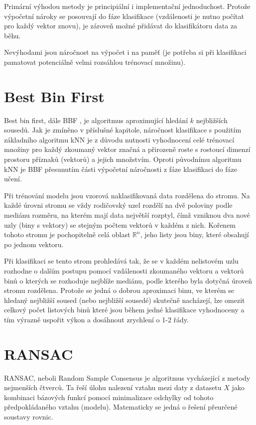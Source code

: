 	Primární výhodou metody je principiální i implementační jednoduchost. Protože výpočetní nároky se posouvají do fáze klasifikace (vzdálenosti je nutno počítat pro každý vektor znovu), je zároveň možné přidávat do klasifikátoru data za běhu.
	
	Nevýhodami jsou náročnost na výpočet i na paměť (je potřeba si při klasifikaci pamatovat potenciálně velmi rozsáhlou trénovací množinu).
	
\section{Best Bin First}
\label{sec:bbf}
	Best bin first, dále BBF \cite{beis1997shape}, je algoritmus aproximující hledání $k$ nejbližších sousedů. Jak je zmíněno v příslušné kapitole, náročnost klasifikace s použitím základního algoritmu kNN je z důvodu nutnosti vyhodnocení celé trénovací množiny pro každý zkoumaný vektor značná a přirozeně roste s rostoucí dimenzí prostoru příznaků (vektorů) a jejich množstvím. Oproti původnímu algoritmu kNN je BBF přesunutím části výpočetní náročnosti z fáze klasifikaci do fáze učení.
	
	Při trénování modelu jsou vzorová naklasifikovaná data rozdělena do stromu. Na každé úrovni stromu se vždy rodičovský uzel rozdělí na dvě poloviny podle mediánu rozměru, na kterém mají data největší rozptyl, čímž vzniknou dva nové uzly (biny s vektory) se stejným počtem vektorů v každém z nich. Kořenem tohoto stromu je pochopitelně celá oblast $\mathbb{R}^n$, jeho listy jsou biny, které obsahují po jednom vektoru.
	
	Při klasifikaci se tento strom prohledává tak, že se v každém nelistovém uzlu rozhodne o dalším postupu pomocí vzdálenosti zkoumaného vektoru a vektorů binů o kterých se rozhoduje nejblíže mediánu, podle kterého byla dotyčná úroveň stromu rozdělena. Protože se jedná o dobrou aproximaci binu, ve kterém se hledaný nejbližší soused (nebo nejbližší sousedé) skutečně nacházejí, lze omezit celkový počet listových binů které jsou během jedné klasifikace vyhodnoceny a tím výrazně uspořit výkon a dosáhnout zrychlení o 1-2 řády.
	
	

\section{RANSAC}
\label{chap_RANSAC} 

	RANSAC, neboli Random Sample Consensus \cite{imageproc_textbook} je algoritmus vycházející z metody nejmenších čtverců. Ta řeší úlohu nalezení vztahu mezi daty z datasetu $X$ jako kombinaci bázových funkcí pomocí minimalizace odchylky od tohoto předpokládaného vztahu (modelu). Matematicky se jedná o řešení přeurčené soustavy rovnic.
	
